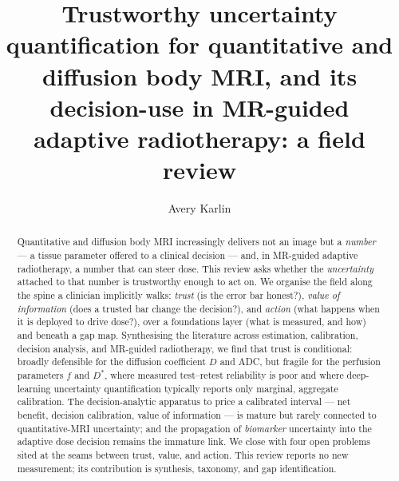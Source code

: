 \documentclass{iopjournal}
\newcommand{\Dstar}{D^{*}}
\begin{document}

\title{Trustworthy uncertainty quantification for quantitative and diffusion body MRI,
and its decision-use in MR-guided adaptive radiotherapy: a field review}

\author{Avery Karlin}




\begin{abstract}
Quantitative and diffusion body MRI increasingly delivers not an image but a
\emph{number} --- a tissue parameter offered to a clinical decision --- and, in
MR-guided adaptive radiotherapy, a number that can steer dose. This review asks whether
the \emph{uncertainty} attached to that number is trustworthy enough to act on. We
organise the field along the spine a clinician implicitly walks: \emph{trust} (is the
error bar honest?), \emph{value of information} (does a trusted bar change the
decision?), and \emph{action} (what happens when it is deployed to drive dose?), over a
foundations layer (what is measured, and how) and beneath a gap map. Synthesising the
literature across estimation, calibration, decision analysis, and MR-guided
radiotherapy, we find that trust is conditional: broadly defensible for the diffusion
coefficient $D$ and ADC, but fragile for the perfusion parameters $f$ and $\Dstar$,
where measured test--retest reliability is poor and where deep-learning uncertainty
quantification typically reports only marginal, aggregate calibration. The
decision-analytic apparatus to price a calibrated interval --- net benefit, decision
calibration, value of information --- is mature but rarely connected to
quantitative-MRI uncertainty; and the propagation of \emph{biomarker} uncertainty into
the adaptive dose decision remains the immature link. We close with four open problems
sited at the seams between trust, value, and action. This review reports no new
measurement; its contribution is synthesis, taxonomy, and gap identification.
\end{abstract}
\end{document}
